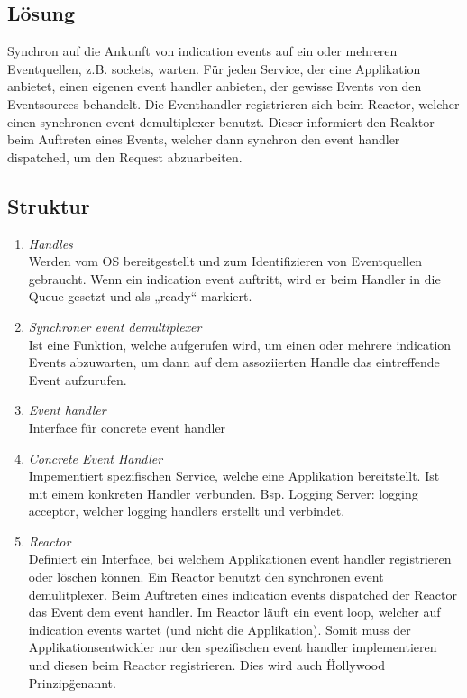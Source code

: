 \subsection{Lösung}

Synchron auf die Ankunft von indication events auf ein oder mehreren Eventquellen, z.B. sockets, warten.
Für jeden Service, der eine Applikation anbietet, einen eigenen event handler anbieten, der gewisse Events von den Eventsources behandelt. Die Eventhandler registrieren sich beim Reactor, welcher einen synchronen event demultiplexer benutzt. Dieser informiert den Reaktor beim Auftreten eines Events, welcher dann synchron den event handler dispatched, um den Request abzuarbeiten.


\subsection{Struktur}

\begin{enumerate}
	\item \emph{Handles}\\
	Werden vom OS bereitgestellt und zum Identifizieren von Eventquellen gebraucht. Wenn ein indication event auftritt, wird er beim Handler in die Queue gesetzt und als „ready“ markiert.
	\item \emph{Synchroner event demultiplexer}\\
	Ist eine Funktion, welche aufgerufen wird, um einen oder mehrere indication Events abzuwarten, um dann auf dem assoziierten Handle das eintreffende Event aufzurufen.
	\item \emph{Event handler}\\
	Interface für concrete event handler
	\item \emph{Concrete Event Handler}\\
	Impementiert spezifischen Service, welche eine Applikation bereitstellt. Ist mit einem konkreten Handler verbunden. Bsp. Logging Server: logging acceptor, welcher logging handlers erstellt und verbindet.
	\item \emph{Reactor}\\
	Definiert ein Interface, bei welchem Applikationen event handler registrieren oder löschen können. Ein Reactor benutzt den synchronen event demulitplexer. Beim Auftreten eines indication events dispatched der Reactor das Event dem event handler. Im Reactor läuft ein event loop, welcher auf indication events wartet (und nicht die Applikation). Somit muss der Applikationsentwickler nur den spezifischen event handler implementieren und diesen beim Reactor registrieren. Dies wird auch \"Hollywood Prinzip\" genannt.
\end{enumerate}


